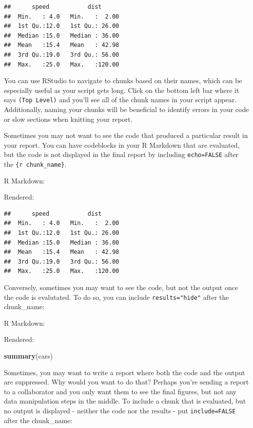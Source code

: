 \documentclass[
]{book}
\newenvironment{Shaded}{\begin{snugshade}}{\end{snugshade}}
\newcommand{\KeywordTok}[1]{\textcolor[rgb]{0.13,0.29,0.53}{\textbf{#1}}}
\newcommand{\NormalTok}[1]{#1}
\begin{document}
\begin{verbatim}
##      speed           dist       
##  Min.   : 4.0   Min.   :  2.00  
##  1st Qu.:12.0   1st Qu.: 26.00  
##  Median :15.0   Median : 36.00  
##  Mean   :15.4   Mean   : 42.98  
##  3rd Qu.:19.0   3rd Qu.: 56.00  
##  Max.   :25.0   Max.   :120.00
\end{verbatim}

You can use RStudio to navigate to chunks based on their names, which can be especially useful as your script gets long. Click on the bottom left bar where it says \texttt{(Top\ Level)} and you'll see all of the chunk names in your script appear. Additionally, naming your chunks will be beneficial to identify errors in your code or slow sections when knitting your report.

Sometimes you may not want to see the code that produced a particular result in your report. You can have codeblocks in your R Markdown that are evaluated, but the code is not displayed in the final report by including \texttt{echo=FALSE} after the \texttt{\{r\ chunk\_name\}}.

R Markdown:

Rendered:

\begin{verbatim}
##      speed           dist       
##  Min.   : 4.0   Min.   :  2.00  
##  1st Qu.:12.0   1st Qu.: 26.00  
##  Median :15.0   Median : 36.00  
##  Mean   :15.4   Mean   : 42.98  
##  3rd Qu.:19.0   3rd Qu.: 56.00  
##  Max.   :25.0   Max.   :120.00
\end{verbatim}

Conversely, sometimes you may want to see the code, but not the output once the code is evalutated. To do so, you can include \texttt{results="hide"} after the chunk\_name:

R Markdown:

Rendered:

\begin{Shaded}
\begin{Highlighting}[]
\KeywordTok{summary}\NormalTok{(cars)}
\end{Highlighting}
\end{Shaded}

Sometimes, you may want to write a report where both the code and the output are suppressed. Why would you want to do that? Perhaps you're sending a report to a collaborator and you only want them to see the final figures, but not any data manipulation steps in the middle. To include a chunk that is evaluated, but no output is displayed - neither the code nor the results - put \texttt{include=FALSE} after the chunk\_name:
\end{document}
